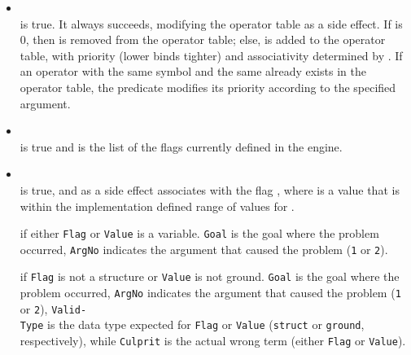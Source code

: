 \begin{itemize}

\item {}\\
    \noindent{} is true. It always succeeds,
    modifying the operator table as a side effect. If  is 0, then
     is removed from the operator table; else,  is
    added to the operator table, with priority (lower binds tighter) 
    and associativity determined by . If an operator with the same
     symbol and the same  already exists in the operator
    table, the predicate modifies its priority according to the specified  argument.


 \item {}\\
     \noindent{} is true and  is the list of the flags currently defined in the engine.

 
\item {}\\
    \noindent{} is true, and as a side effect associates  with the flag , where  is a value that is within the implementation defined range of values for .


     if either \texttt{Flag} or \texttt{Value} is a variable. \texttt{Goal} is the goal where the problem occurred, \texttt{ArgNo} indicates the argument that caused the problem (\texttt{1} or \texttt{2}).

     if \texttt{Flag} is not a structure or \texttt{Value} is not ground. \texttt{Goal} is the goal where the problem occurred, \texttt{ArgNo} indicates the argument that caused the problem (\texttt{1} or \texttt{2}), \texttt{Valid-}\\\texttt{Type} is the data type expected for \texttt{Flag} or \texttt{Value} (\texttt{struct} or \texttt{ground}, respectively), while \texttt{Culprit} is the actual wrong term (either \texttt{Flag} or \texttt{Value}).


\end{itemize}
